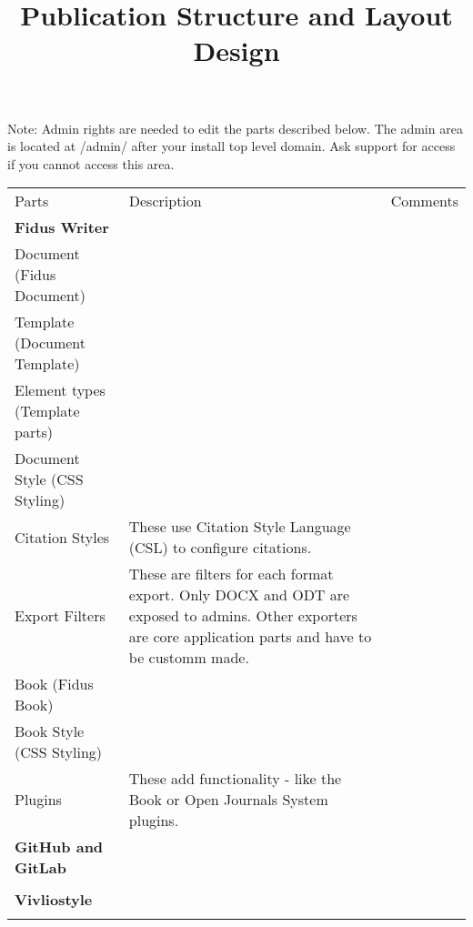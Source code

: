 \documentclass{article}
\begin{document}
\title{Publication Structure and Layout Design}

\maketitle


Note: Admin rights are needed to edit the parts described below. The admin area is located at /admin/ after your install top level domain. Ask support for access if you cannot access this area.


\begin{tabu} to \textwidth { |X|X|X| }
\hline



Parts & Description & Comments
 \\


\textbf{Fidus Writer} &  & 
 \\


Document (Fidus Document) &  & 
 \\


Template (Document Template) &  & 
 \\


Element types (Template parts) &  & 
 \\


Document Style (CSS Styling) &  & 
 \\


Citation Styles & These use Citation Style Language (CSL) to configure citations. & 
 \\


Export Filters & These are filters for each format export. Only DOCX and ODT are exposed to admins. Other exporters are core application parts and have to be customm made. & 
 \\


Book (Fidus Book) &  & 
 \\


Book Style (CSS Styling) &  & 
 \\


Plugins  & These add functionality - like the Book or Open Journals System plugins. & 
 \\


\textbf{GitHub and GitLab} &  & 
 \\


 &  & 
 \\


\textbf{Vivliostyle} &  & 
 \\


 &  & 
 \\
\hline

\end{tabu}
\end{document}
